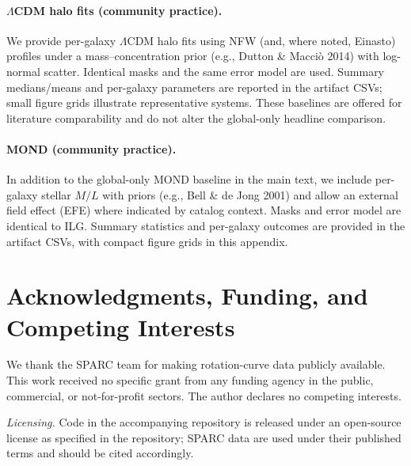 \documentclass[usenatbib]{mnras}
\begin{document}
\paragraph{$\Lambda$CDM halo fits (community practice).} We provide per-galaxy $\Lambda$CDM halo fits using NFW (and, where noted, Einasto) profiles under a mass–concentration prior (e.g., Dutton \& Macci\`o 2014) with log-normal scatter. Identical masks and the same error model are used. Summary medians/means and per-galaxy parameters are reported in the artifact CSVs; small figure grids illustrate representative systems. These baselines are offered for literature comparability and do not alter the global-only headline comparison.

\paragraph{MOND (community practice).} In addition to the global-only MOND baseline in the main text, we include per-galaxy stellar $M/L$ with priors (e.g., Bell \& de Jong 2001) and allow an external field effect (EFE) where indicated by catalog context. Masks and error model are identical to ILG. Summary statistics and per-galaxy outcomes are provided in the artifact CSVs, with compact figure grids in this appendix.

\section*{Acknowledgments, Funding, and Competing Interests}
\noindent We thank the SPARC team for making rotation-curve data publicly available. This work received no specific grant from any funding agency in the public, commercial, or not-for-profit sectors. The author declares no competing interests.

\noindent \textit{Licensing.} Code in the accompanying repository is released under an open-source license as specified in the repository; SPARC data are used under their published terms and should be cited accordingly.
\end{document}
